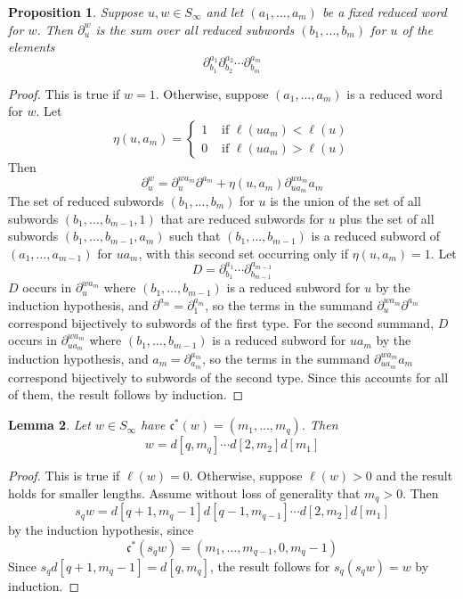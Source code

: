 \documentclass{amsart}
\newtheorem{lemma}{Lemma}[subsection]
\newtheorem{proposition}[lemma]{Proposition}
\theoremstyle{definition}
\theoremstyle{remark}
\numberwithin{equation}{subsection}
\newcommand{\code}{\mathfrak{c}}
\begin{document}
\begin{proposition} \label{proposition:divcompute}
Suppose $u,w\in S_\infty$ and let $(a_1,\ldots,a_m)$ be a fixed reduced word for $w$. Then $\partial_u^w$ is the sum over all reduced subwords $(b_1,\ldots,b_m)$ for $u$ of the elements
$$\partial_{b_1}^{a_1}\partial_{b_2}^{a_2}\cdots\partial_{b_m}^{a_m}$$
\end{proposition}
\begin{proof}
This is true if $w=1$. Otherwise, suppose $(a_1,\ldots,a_m)$ is a reduced word for $w$. Let 
$$\eta(u,a_m)=\begin{cases}1&\mbox{ if }\ell(ua_m)<\ell(u)\\
0&\mbox{ if }\ell(ua_m)>\ell(u)
\end{cases}$$
Then
$$\partial_u^w=\partial_u^{wa_m}\partial^{a_m}+\eta(u,a_m)\partial_{ua_m}^{wa_m}a_m$$
The set of reduced subwords $(b_1,\ldots,b_m)$ for $u$ is the union of the set of all subwords $(b_1,\ldots,b_{m-1},1)$ that are reduced subwords for $u$ plus the set of all subwords $(b_1,\ldots,b_{m-1},a_m)$ such that $(b_1,\ldots,b_{m-1})$ is a reduced subword of $(a_1,\ldots,a_{m-1})$ for $ua_m$, with this second set occurring only if $\eta(u,a_m)=1$. Let
$$D=\partial_{b_1}^{a_1}\cdots\partial_{b_{m-1}}^{a_{m-1}}$$
$D$ occurs in $\partial_{u}^{wa_m}$ where $(b_1,\ldots,b_{m-1})$ is a reduced subword for $u$ by the induction hypothesis, and $\partial^{a_m}=\partial_{1}^{a_m}$, so the terms in the summand $\partial_u^{wa_m}\partial^{a_m}$ correspond bijectively to subwords of the first type. For the second summand, $D$ occurs in $\partial_{ua_m}^{wa_m}$ where $(b_1,\ldots,b_{m-1})$ is a reduced subword for $ua_m$ by the induction hypothesis, and $a_m=\partial_{a_m}^{a_m}$, so the terms in the summand $\partial_{ua_m}^{wa_m}a_m$ correspond bijectively to subwords of the second type. Since this accounts for all of them, the result follows by induction.
\end{proof}


\begin{lemma} \label{lemma:coderesult}
Let $w\in S_\infty$ have $\code^*(w)=(m_1,\ldots,m_q)$. Then
$$w=d[q,m_q]\cdots d[2,m_2]d[m_1]$$
\end{lemma}
\begin{proof}
This is true if $\ell(w)=0$. Otherwise, suppose $\ell(w)>0$ and the result holds for smaller lengths. Assume without loss of generality that $m_q>0$. Then
$$s_qw=d[q+1,m_q-1]d[q-1,m_{q-1}]\cdots d[2,m_2]d[m_1]$$
by the induction hypothesis, since
$$\code^*(s_qw)=(m_1,\ldots,m_{q-1},0,m_q-1)$$
Since $s_qd[q+1,m_q-1]=d[q,m_q]$, the result follows for $s_q(s_qw)=w$ by induction.
\end{proof}
\end{document}
